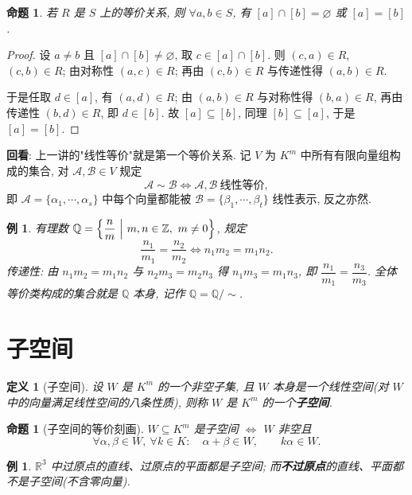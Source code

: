 \documentclass[UTF8,11pt]{ctexart}
\theoremstyle{cnthm}
\newtheorem{prop}[thm]{命题}
\newtheorem{defn}[thm]{定义}
\newtheorem{exa}[thm]{例}
\begin{document}
\begin{prop}
若 $R$ 是 $S$ 上的等价关系, 则 $\forall a,b\in S$, 有 $[a]\cap[b]=\varnothing$ 或 $[a]=[b]$.
\end{prop}

\begin{proof}
设 $a\neq b$ 且 $[a]\cap[b]\neq\varnothing$, 取 $c\in[a]\cap[b]$. 则 $(c,a)\in R$, $(c,b)\in R$; 由对称性 $(a,c)\in R$; 再由 $(c,b)\in R$ 与传递性得 $(a,b)\in R$.

于是任取 $d\in[a]$, 有 $(a,d)\in R$; 由 $(a,b)\in R$ 与对称性得 $(b,a)\in R$, 再由传递性 $(b,d)\in R$, 即 $d\in[b]$. 故 $[a]\subseteq[b]$, 同理 $[b]\subseteq[a]$, 于是 $[a]=[b]$.
\end{proof}

\textbf{回看}: 上一讲的"线性等价"就是第一个等价关系. 记 $V$ 为 $K^m$ 中所有有限向量组构成的集合, 对 $\mathcal A,\mathcal B\in V$ 规定
\[
\mathcal A\sim\mathcal B\iff \mathcal A,\mathcal B\ \text{线性等价},
\]
即 $\mathcal A=\{\alpha_1,\cdots,\alpha_s\}$ 中每个向量都能被 $\mathcal B=\{\beta_1,\cdots,\beta_t\}$ 线性表示, 反之亦然.

\begin{exa}
有理数 $\mathbb{Q}=\Bigl\{\dfrac nm\ \Big|\ m,n\in\mathbb{Z},\ m\neq0\Bigr\}$, 规定
\[
\frac{n_1}{m_1}=\frac{n_2}{m_2}\iff n_1m_2=m_1n_2 .
\]
传递性: 由 $n_1m_2=m_1n_2$ 与 $n_2m_3=m_2n_3$ 得 $n_1m_3=m_1n_3$, 即 $\dfrac{n_1}{m_1}=\dfrac{n_3}{m_3}$. 全体等价类构成的集合就是 $\mathbb{Q}$ 本身, 记作 $\mathbb{Q}=\mathbb{Q}/\!\sim$.
\end{exa}

\section{子空间}

\begin{defn}[子空间]
设 $W$ 是 $K^m$ 的一个非空子集, 且 $W$ 本身是一个线性空间(对 $W$ 中的向量满足线性空间的八条性质), 则称 $W$ 是 $K^m$ 的一个\textbf{子空间}.
\end{defn}

\begin{prop}[子空间的等价刻画]
$W\subseteq K^m$ 是子空间 $\iff$ $W$ 非空且
\[
\forall\alpha,\beta\in W,\ \forall k\in K:\quad \alpha+\beta\in W,\qquad k\alpha\in W .
\]
\end{prop}

\begin{exa}
$\mathbb{R}^3$ 中过原点的直线、过原点的平面都是子空间; 而\textbf{不过原点}的直线、平面都不是子空间(不含零向量).
\end{exa}
\end{document}
